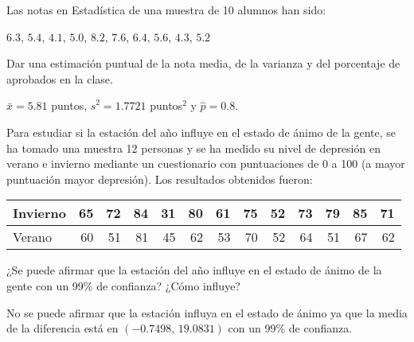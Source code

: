{Las notas en Estadística de una muestra de 10 alumnos han sido:
\begin{center}
$6.3$, $5.4$, $4.1$, $5.0$, $8.2$, $7.6$, $6.4$, $5.6$, $4.3$, $5.2$
\end{center}
Dar una estimación puntual de la nota media, de la varianza y del porcentaje de aprobados en la clase.
}
{$\bar x= 5.81$ puntos, $\hat s^2=1.7721$ puntos$^2$ y $\hat p=0.8$.}
{}


{Para estudiar si la estación del año influye en el estado de ánimo de la gente, se ha tomado una muestra 12 personas y
se ha medido su nivel de depresión en verano e invierno mediante un cuestionario con puntuaciones de 0 a 100 (a mayor
puntuación mayor depresión). Los resultados obtenidos fueron:
\begin{center}
\begin{tabular}{|l|r|r|r|r|r|r|r|r|r|r|r|r|}
\hline
Invierno & 65 & 72 & 84 & 31 & 80 & 61 & 75 & 52 & 73 & 79 & 85 & 71\\
\hline
Verano &   60 & 51 & 81 & 45 & 62 & 53 & 70 & 52 & 64 & 51 & 67 & 62\\
\hline
\end{tabular}
\end{center}
¿Se puede afirmar que la estación del año influye en el estado de ánimo de la gente con un 99\% de confianza?
¿Cómo influye?
}
{
No se puede afirmar que la estación influya en el estado de ánimo ya que la media de la diferencia está en
$(-0.7498,\,19.0831)$ con un 99\% de confianza.}
{}



